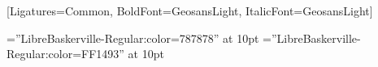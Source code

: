 \setsansfont{GeosansLight}[Ligatures={Common}, BoldFont={GeosansLight}, ItalicFont={GeosansLight}]

\setmonofont{Consolas}

\font\lighttext=''LibreBaskerville-Regular:color=787878'' at 10pt
\font\lighttextweb=''LibreBaskerville-Regular:color=FF1493'' at 10pt

\titleformat{\section}{\Large\scshape\raggedright}{}{0em}{}[\titlerule]
\titlespacing{\section}{0pt}{4pt}{3pt}
\setlength{\parindent}{0pt}

\newenvironment{education}
{
	\begin{tabu} to \textwidth {@{} X[1,r] | X[5,l] @{}}
}
{
	\end{tabu}
}
\newcommand{\eduentry}[2]{
	\textsc{#1} & \begin{tabu}{@{} X @{}}
		#2
	\end{tabu}\\
	\multicolumn{2}{c}{}\\ [-1ex]
}
\newcommand{\degree}[1]{\textbf{#1}}
\newcommand{\institution}[1]{\textsc{#1}}
\newenvironment{experiences}
{
	\begin{tabu} to \textwidth {@{} X[1,r] | X[5,l] @{}}
}
{
	\end{tabu}
}
\newcommand{\experience}[5]{
	\textsc{#1} & \begin{tabu}{@{} X @{}}
		\textbf{#2} #3 \textsc{#4}\\
		#5
	\end{tabu}\\
	\multicolumn{2}{c}{}\\ [-1ex]
}
\newenvironment{skillslisting}
{
	\begin{multicols}{4}
	\raggedcolumns
	\begin{itemize}
	\renewcommand{\labelitemi}{}
	\renewcommand{\skill}{\textnormal}
	\setlength{\itemsep}{0pt}
	\setlength{\parskip}{0pt}
	\setlength{\parsep}{0pt}
}
{
	\end{itemize}
	\end{multicols}
}

\newcommand{\skills}[2]{
	\item #1 #2
}
\newcommand{\skill}{\textbf}
\newcommand{\proj}[3]{
	\textsc{#1} & #2\\
	&\href{http://www.#3}{#3}\\
	\multicolumn{2}{c}{} \\ [-1ex]
}
\newcommand{\projl}[3]{
	\textsc{#1} & #2\\
	&\href{http://www.#3}{#3}\\
}
\newcommand{\projlh}[4]{
	\textsc{#1} & #2\\
	&\href{#3}{#4}\\
}

